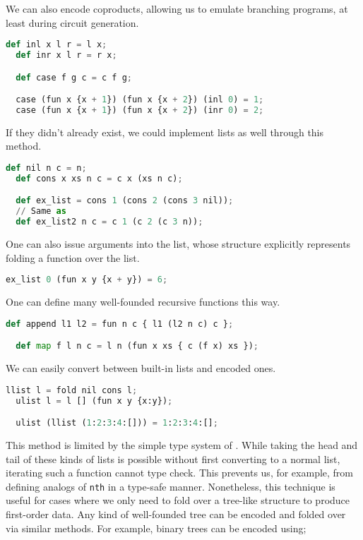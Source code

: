 We can also encode coproducts, allowing us to emulate branching programs, at least during circuit generation.

\begin{lstlisting}[language=Python]
  def inl x l r = l x;
  def inr x l r = r x;

  def case f g c = c f g;

  case (fun x {x + 1}) (fun x {x + 2}) (inl 0) = 1;
  case (fun x {x + 1}) (fun x {x + 2}) (inr 0) = 2;
\end{lstlisting}

If they didn't already exist, we could implement lists as well through this method.

\begin{lstlisting}[language=Python]
  def nil n c = n;
  def cons x xs n c = c x (xs n c);

  def ex_list = cons 1 (cons 2 (cons 3 nil));
  // Same as
  def ex_list2 n c = c 1 (c 2 (c 3 n));
\end{lstlisting}

One can also issue arguments into the list, whose structure explicitly represents folding a function over the list.

\begin{lstlisting}[language=Python]
  ex_list 0 (fun x y {x + y}) = 6;
\end{lstlisting}

One can define many well-founded recursive functions this way.

\begin{lstlisting}[language=Python]
  def append l1 l2 = fun n c { l1 (l2 n c) c };

  def map f l n c = l n (fun x xs { c (f x) xs });
\end{lstlisting}

We can easily convert between built-in lists and encoded ones.

\begin{lstlisting}[language=Python]
  llist l = fold nil cons l;
  ulist l = l [] (fun x y {x:y});

  ulist (llist (1:2:3:4:[])) = 1:2:3:4:[];
\end{lstlisting}

This method is limited by the simple type system of \vampir. While taking the head and tail of these kinds of lists is possible without first converting to a normal list, iterating such a function cannot type check. This prevents us, for example, from defining analogs of \lstinline|nth| in a type-safe manner. Nonetheless, this technique is useful for cases where we only need to fold over a tree-like structure to produce first-order data. Any kind of well-founded tree can be encoded and folded over via similar methods. For example, binary trees can be encoded using;

